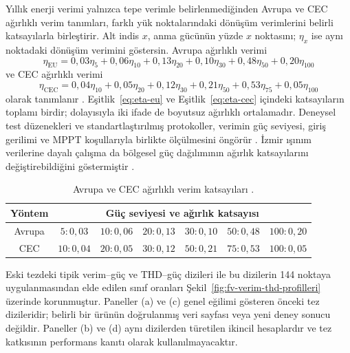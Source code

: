 Yıllık enerji verimi yalnızca tepe verimle belirlenmediğinden Avrupa ve CEC ağırlıklı verim tanımları, farklı yük noktalarındaki dönüşüm verimlerini belirli katsayılarla birleştirir. Alt indis $x$, anma gücünün yüzde $x$ noktasını; $\eta_x$ ise aynı noktadaki dönüşüm verimini göstersin. Avrupa ağırlıklı verimi
\begin{equation}
\eta_{\mathrm{EU}}=0{,}03\eta_{5}+0{,}06\eta_{10}+0{,}13\eta_{20}+0{,}10\eta_{30}+0{,}48\eta_{50}+0{,}20\eta_{100}
\label{eq:eta-eu}
\end{equation}
ve CEC ağırlıklı verimi
\begin{equation}
\eta_{\mathrm{CEC}}=0{,}04\eta_{10}+0{,}05\eta_{20}+0{,}12\eta_{30}+0{,}21\eta_{50}+0{,}53\eta_{75}+0{,}05\eta_{100}
\label{eq:eta-cec}
\end{equation}
olarak tanımlanır \citep{Sera2008,Sandia2015}. Eşitlik~\eqref{eq:eta-eu} ve Eşitlik~\eqref{eq:eta-cec} içindeki katsayıların toplamı birdir; dolayısıyla iki ifade de boyutsuz ağırlıklı ortalamadır. Deneysel test düzenekleri ve standartlaştırılmış protokoller, verimin güç seviyesi, giriş gerilimi ve MPPT koşullarıyla birlikte ölçülmesini öngörür \citep{Sera2008,Sandia2015}. İzmir ışınım verilerine dayalı çalışma da bölgesel güç dağılımının ağırlık katsayılarını değiştirebildiğini göstermiştir \citep{Ongun2013}.

\begin{table}[htbp]
  \centering
  \caption{\eskitezetiketi\ \diskaynaketiketi\ Avrupa ve CEC ağırlıklı verim katsayıları \citep{Sera2008,Sandia2015}.}
  \label{tab:agirlikli-verim-katsayilari}
  \begin{tabular}{c*{6}{c}}
    \toprule
    \textbf{Yöntem} & \multicolumn{6}{c}{\textbf{Güç seviyesi ve ağırlık katsayısı}} \\
    \midrule
    Avrupa & $5:0{,}03$ & $10:0{,}06$ & $20:0{,}13$ & $30:0{,}10$ & $50:0{,}48$ & $100:0{,}20$ \\
    CEC & $10:0{,}04$ & $20:0{,}05$ & $30:0{,}12$ & $50:0{,}21$ & $75:0{,}53$ & $100:0{,}05$ \\
    \bottomrule
  \end{tabular}
\end{table}

Eski tezdeki tipik verim--güç ve THD--güç dizileri ile bu dizilerin 144 noktaya uygulanmasından elde edilen sınıf oranları Şekil~\ref{fig:fv-verim-thd-profilleri} üzerinde korunmuştur. Paneller (a) ve (c) genel eğilimi gösteren önceki tez dizileridir; belirli bir ürünün doğrulanmış veri sayfası veya yeni deney sonucu değildir. Paneller (b) ve (d) aynı dizilerden türetilen ikincil hesaplardır ve tez katkısının performans kanıtı olarak kullanılmayacaktır.

